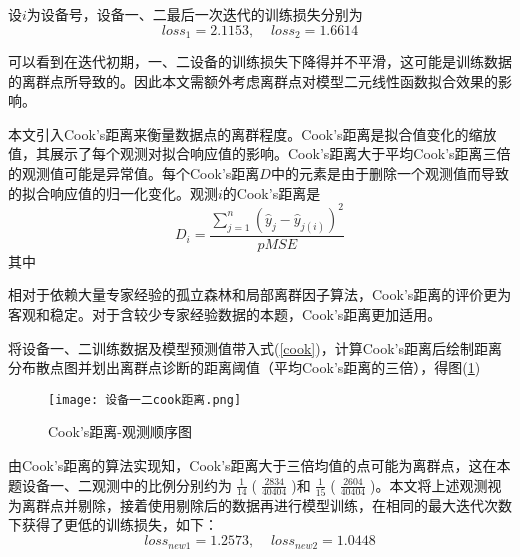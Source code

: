 \documentclass[withoutpreface,bwprint]{cumcmthesis}  %
\begin{document}
        设$i$为设备号，设备一、二最后一次迭代的训练损失分别为
        \[
        loss_{1}=2.1153,\;\;\;\;loss_{2}=1.6614
        \]
        
        可以看到在迭代初期，一、二设备的训练损失下降得并不平滑，这可能是训练数据的离群点所导致的。因此本文需额外考虑离群点对模型二元线性函数拟合效果的影响。

        本文引入Cook's距离来衡量数据点的离群程度。Cook's距离是拟合值变化的缩放值，其展示了每个观测对拟合响应值的影响。Cook's距离大于平均Cook's距离三倍的观测值可能是异常值。每个Cook's距离$D$中的元素是由于删除一个观测值而导致的拟合响应值的归一化变化。观测$i$的Cook's距离是
        \begin{equation}
        D_{i}=\frac{\sum_{j=1}^{n}(\hat{y}_{j}-\hat{y}_{j(i)})^{2}}{pMSE} 
        \label{cook}
        \end{equation}
        其中
        
        
        

        相对于依赖大量专家经验的孤立森林和局部离群因子算法，Cook's距离的评价更为客观和稳定。对于含较少专家经验数据的本题，Cook's距离更加适用。

        将设备一、二训练数据及模型预测值带入式(\ref{cook})，计算Cook's距离后绘制距离分布散点图并划出离群点诊断的距离阈值（平均Cook's距离的三倍），得图(\ref{cook_dis})
        \begin{figure}[H]
		\centering
		\texttt{[image: 设备一二cook距离.png]}
		\caption{Cook's距离-观测顺序图}
		\label{cook_dis}     %
	\end{figure}

        由Cook's距离的算法实现知，Cook's距离大于三倍均值的点可能为离群点，这在本题设备一、二观测中的比例分别约为$\;\frac{1}{14}\;$($\;\frac{2834}{40404}\;$)和$\;\frac{1}{15}\;$($\;\frac{2604}{40404}\;$)。本文将上述观测视为离群点并剔除，接着使用剔除后的数据再进行模型训练，在相同的最大迭代次数下获得了更低的训练损失，如下：
        \[
        loss_{new1}=1.2573,\;\;\;\;loss_{new2}=1.0448
        \]
\end{document}
